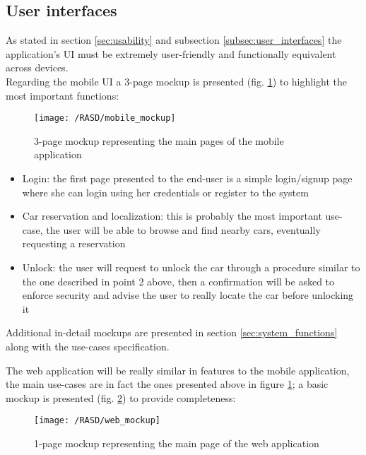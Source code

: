 \subsection{User interfaces} %
As stated in section \ref{sec:usability} and subsection \ref{subsec:user_interfaces} the application's UI must be extremely user-friendly and functionally equivalent across devices. 
\\Regarding the mobile UI a 3-page mockup is presented (fig. \ref{fig:mobile_mockup}) to highlight the most important functions: 
\begin{figure}[!ht]
	\centering
	\vspace{0.2cm}
	\texttt{[image: /RASD/mobile\_mockup]}\\ 
	\vspace{0.5cm}
	\caption{3-page mockup representing the main pages of the mobile application} \label{fig:mobile_mockup} 
\end{figure}
\begin{itemize}
	\item{Login: the first page presented to the end-user is a simple login/signup page where she can login using her credentials or register to the system}
	\item{Car reservation and localization: this is probably the most important use-case, the user will be able to browse and find nearby cars, eventually requesting a reservation}
	\item{Unlock: the user will request to unlock the car through a procedure similar to the one described in point 2 above, then a confirmation will be asked to enforce security and advise the user to really locate the car before unlocking it}
\end{itemize}

\bigskip
Additional in-detail mockups are presented in section \ref{sec:system_functions} along with the use-cases specification.
\bigskip

The web application will be really similar in features to the mobile application, the main use-cases are in fact the ones presented above in figure \ref{fig:mobile_mockup}; a basic mockup is presented (fig. \ref{fig:web_mockup}) to provide completeness:
\begin{figure}[!ht]
	\centering
	\vspace{0.2cm}{}
	\texttt{[image: /RASD/web\_mockup]}\\ 
	\vspace{0.5cm}
	\caption{1-page mockup representing the main page of the web application} \label{fig:web_mockup} 
\end{figure}


